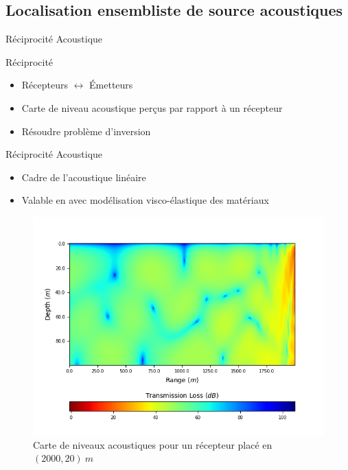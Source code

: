 \documentclass[9pt, xcolor={usenames, dvipsnames}]{beamer}
\begin{document}
		\subsection{Localisation ensembliste de source acoustiques}

			\begin{frame}{Réciprocité Acoustique}
				\begin{minipage}{0.45\textwidth}
					\begin{block}{Réciprocité}
						\begin{itemize}
							\item Récepteurs $\leftrightarrow$ Émetteurs
							\item Carte de niveau acoustique perçus par rapport à un récepteur
							\item Résoudre problème d'inversion
						\end{itemize}
					\end{block}
					\begin{block}{Réciprocité Acoustique}
						\begin{itemize}
							\item Cadre de l'acoustique linéaire~\cite{rayleigh1896theory}
							\item Valable en avec modélisation visco-élastique des matériaux
						\end{itemize}
					\end{block}
				\end{minipage}
				\hfill
				\begin{minipage}{0.45\textwidth}
					\begin{figure}
						\includegraphics[width=\textwidth]{images/Reciever_20_2000.png}
						\caption{Carte de niveaux acoustiques pour un récepteur placé en $(2000, 20)\ m$}
					\end{figure}
				\end{minipage}
			\end{frame}
\end{document}
